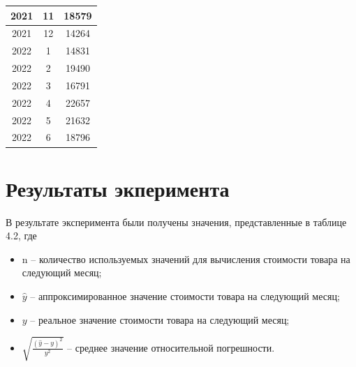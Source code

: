 \documentclass[a4paper,14pt]{extreport}
\begin{document}
\begin{table}[H]
\begin{center}
\begin{tabular}{| c | c | c |}
			\hline
			
			2021 & 11 & 18579 \\
			
			\hline
			
			2021 & 12 & 14264 \\
			
			\hline
			
			2022 & 1 & 14831 \\
			
			\hline
			
			2022 & 2 & 19490 \\
			
			\hline
			
			2022 & 3 & 16791 \\
			
			\hline
			
			2022 & 4 & 22657 \\
			
			\hline
			
			2022 & 5 & 21632 \\
			
			\hline
			
			2022 & 6 & 18796 \\
			
			\hline
		\end{tabular}
	\end{center}
\end{table}

\section{Результаты экперимента}

В результате эксперимента были получены значения, представленные в таблице 4.2, где

\begin{itemize}
	\item n -- количество используемых значений для вычисления стоимости товара на следующий месяц;
	\item $\hat{y}$ -- аппроксимированное значение стоимости товара на следующий месяц;
	\item $y$ -- реальное значение стоимости товара на следующий месяц;
	\item $\sqrt{\frac{(\hat{y} - y) ^ 2}{y ^ 2}}$ -- среднее значение относительной погрешности.
\end{itemize}
\end{document}
